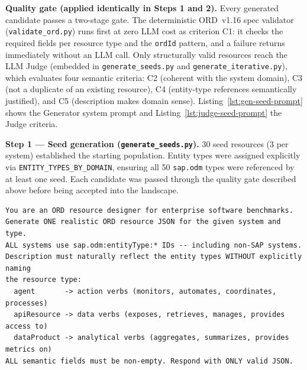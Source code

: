 \textbf{Quality gate (applied identically in Steps 1 and 2).} Every generated candidate passes a two-stage gate. The deterministic ORD~v1.16 spec validator (\texttt{validate\_ord.py}) runs first at zero LLM cost as criterion C1: it checks the required fields per resource type and the \texttt{ordId} pattern, and a failure returns immediately without an LLM call. Only structurally valid resources reach the LLM Judge (embedded in \texttt{generate\_seeds.py} and \texttt{generate\_iterative.py}), which evaluates four semantic criteria: C2 (coherent with the system domain), C3 (not a duplicate of an existing resource), C4 (entity-type references semantically justified), and C5 (description makes domain sense). Listing~\ref{lst:gen-seed-prompt} shows the Generator system prompt and Listing~\ref{lst:judge-seed-prompt} the Judge criteria.

\medskip\noindent\textbf{Step 1 --- Seed generation (\texttt{generate\_seeds.py}).} 30 seed resources (3 per system) established the starting population. Entity types were assigned explicitly via \texttt{ENTITY\_TYPES\_BY\_DOMAIN}, ensuring all 50 \texttt{sap.odm} types were referenced by at least one seed. Each candidate was passed through the quality gate described above before being accepted into the landscape.

\begin{lstlisting}[float=!t, floatplacement=!t, basicstyle=\ttfamily\scriptsize, breaklines=true, frame=single, label={lst:gen-seed-prompt}, caption={Generator system prompt, used for both seed and iterative phases. The prompt enforces that all systems reference \texttt{sap.odm} entity types and that descriptions reflect resource type through verb choice rather than by naming the type explicitly.}]
You are an ORD resource designer for enterprise software benchmarks.
Generate ONE realistic ORD resource JSON for the given system and type.
ALL systems use sap.odm:entityType:* IDs -- including non-SAP systems.
Description must naturally reflect the entity types WITHOUT explicitly naming
the resource type:
  agent       -> action verbs (monitors, automates, coordinates, processes)
  apiResource -> data verbs (exposes, retrieves, manages, provides access to)
  dataProduct -> analytical verbs (aggregates, summarizes, provides metrics on)
ALL semantic fields must be non-empty. Respond with ONLY valid JSON.
\end{lstlisting}


